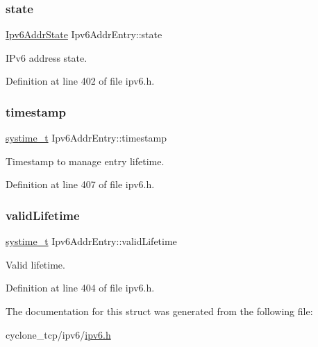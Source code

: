 \subsubsection{\texorpdfstring{state}{state}}
{\footnotesize\ttfamily \hyperlink{ipv6_8h_acb54c5e2b7ee1652f5bf055e14cc518d}{Ipv6\+Addr\+State} Ipv6\+Addr\+Entry\+::state}



I\+Pv6 address state. 



Definition at line 402 of file ipv6.\+h.

\mbox{\label{structIpv6AddrEntry_a9080e69e7dc724704176843cdadfb29b}} 
\subsubsection{\texorpdfstring{timestamp}{timestamp}}
{\footnotesize\ttfamily \hyperlink{compiler__port_8h_ae3e32a98d431a02106616da3071832dd}{systime\+\_\+t} Ipv6\+Addr\+Entry\+::timestamp}



Timestamp to manage entry lifetime. 



Definition at line 407 of file ipv6.\+h.

\mbox{\label{structIpv6AddrEntry_ab56a11d9de06327ab5af04e8ae18164d}} 
\subsubsection{\texorpdfstring{valid\+Lifetime}{validLifetime}}
{\footnotesize\ttfamily \hyperlink{compiler__port_8h_ae3e32a98d431a02106616da3071832dd}{systime\+\_\+t} Ipv6\+Addr\+Entry\+::valid\+Lifetime}



Valid lifetime. 



Definition at line 404 of file ipv6.\+h.



The documentation for this struct was generated from the following file\+:\begin{DoxyCompactItemize}
\item 
cyclone\+\_\+tcp/ipv6/\hyperlink{ipv6_8h}{ipv6.\+h}\end{DoxyCompactItemize}
